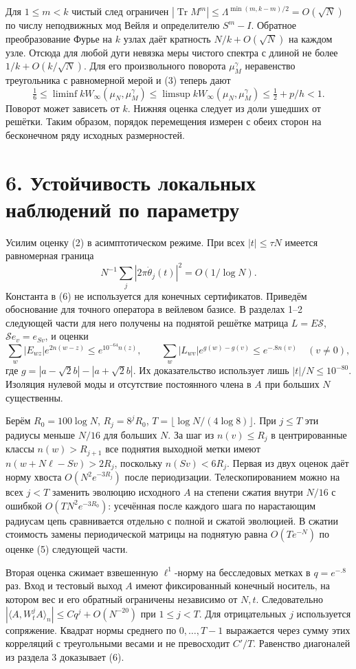 \documentclass[11pt,a4paper]{article}
\newcommand{\Tr}{\operatorname{Tr}}
\newcommand{\sect}[1]{\section*{\sffamily\color{ink}#1}}
\begin{document}
Для $1\le m<k$ чистый след ограничен $|\Tr M^m|\le\Lambda^{\min(m,k-m)/2}=O(\sqrt N)$ по числу неподвижных мод Вейля и определителю $S^m-I$. Обратное преобразование Фурье на $k$ узлах даёт кратность $N/k+O(\sqrt N)$ на каждом узле. Отсюда для любой дуги невязка меры чистого спектра с длиной не более $1/k+O(k/\sqrt N)$. Для его произвольного поворота $\mu_M^\gamma$ неравенство треугольника с равномерной мерой и (3) теперь дают
\[
 \tfrac16\le\liminf k W_\infty(\mu_N,\mu_M^\gamma)
 \le\limsup k W_\infty(\mu_N,\mu_M^\gamma)\le\tfrac12+p/h<1.               \tag{5}
\]
Поворот может зависеть от $k$. Нижняя оценка следует из доли ушедших от решётки. Таким образом, порядок перемещения измерен с обеих сторон на бесконечном ряду исходных размерностей.
\newpage
\sect{6. Устойчивость локальных наблюдений по параметру}
Усилим оценку (2) в асимптотическом режиме. При всех $|t|\le\tau N$ имеется равномерная граница
\[
            N^{-1}\sum_j|2\pi\dot\theta_j(t)|^2=O(1/\log N) .             \tag{6}
\]
Константа в (6) не используется для конечных сертификатов. Приведём обоснование для точного оператора в вейлевом базисе. В разделах 1--2 следующей части для него получены на поднятой решётке матрица $L=E\mathcal S$, $\mathcal S e_v=e_{Sv}$, и оценки
\[
 \sum_w |E_{wz}|e^{2n(w-z)}\le e^{10^{-64}n(z)},\qquad
 \sum_w |L_{wv}|e^{g(w)-g(v)}\le e^{-.8n(v)}\quad(v\ne0),
\]
где $g=|a-\sqrt2 b|-|a+\sqrt2 b|$. Их доказательство использует лишь $|t|/N\le10^{-80}$. Изоляция нулевой моды и отсутствие постоянного члена в $A$ при больших $N$ существенны.

Берём $R_0=100\log N$, $R_j=8^j R_0$, $T=\lfloor\log N/(4\log8)\rfloor$. При $j\le T$ эти радиусы меньше $N/16$ для больших $N$. За шаг из $n(v)\le R_j$ в центрированные классы $n(w)>R_{j+1}$ все поднятия выходной метки имеют $n(w+N\ell-Sv)>2R_j$, поскольку $n(Sv)<6R_j$. Первая из двух оценок даёт норму хвоста $O(N^2e^{-3R_j})$ после периодизации. Телескопированием можно на всех $j<T$ заменить эволюцию исходного $A$ на степени сжатия внутри $N/16$ с ошибкой $O(T N^2e^{-3R_0})$: усечённая после каждого шага по нарастающим радиусам цепь сравнивается отдельно с полной и сжатой эволюцией. В сжатии стоимость замены периодической матрицы на поднятую равна $O(Te^{-N})$ по оценке (5) следующей части.

Вторая оценка сжимает взвешенную $\ell^1$-норму на бесследовых метках в $q=e^{-.8}$ раз. Вход и тестовый выход $A$ имеют фиксированный конечный носитель, на котором вес и его обратный ограничены независимо от $N,t$. Следовательно $|\langle A,W_t^j A\rangle_n|\le Cq^j+O(N^{-20})$ при $1\le j<T$. Для отрицательных $j$ используется сопряжение. Квадрат нормы среднего по $0,\ldots,T-1$ выражается через сумму этих корреляций с треугольными весами и не превосходит $C'/T$. Равенство диагоналей из раздела 3 доказывает (6).
\end{document}
